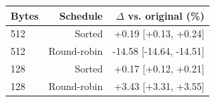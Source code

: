 \begin{tabular}{lrr}
\toprule
Bytes & Schedule & $\Delta$ vs. original (\%) \\
\midrule
512 & Sorted & +0.19 [+0.13, +0.24] \\
512 & Round-robin & -14.58 [-14.64, -14.51] \\
128 & Sorted & +0.17 [+0.12, +0.21] \\
128 & Round-robin & +3.43 [+3.31, +3.55] \\
\bottomrule
\end{tabular}
